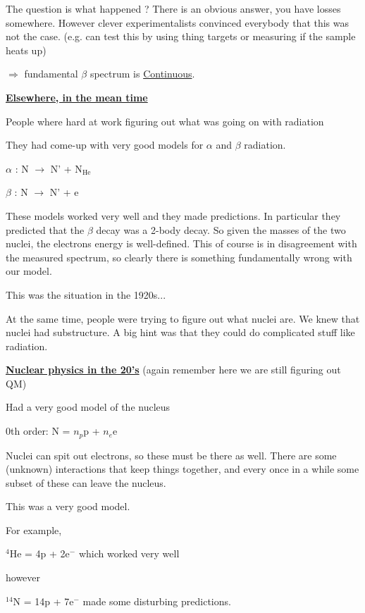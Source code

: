 {The question is what happened ? 
There is an obvious answer, you have losses somewhere. 
However clever experimentalists convinced everybody that this was not the case. 
(e.g. can test this by using thing targets or measuring if the sample heats up)  

$\Rightarrow$ fundamental $\beta$ spectrum is \underline{Continuous}.

\textbf{\underline{Elsewhere, in the mean time} }

People where hard at work figuring out what was going on with radiation

They had come-up with very good models for $\alpha$ and $\beta$ radiation. 

\begin{center}
$\alpha$ : N $\rightarrow$ N' + N$_{\textrm{He}}$

$\beta$ : N $\rightarrow$ N' + e
\end{center}

These models worked very well and they made predictions. 
In particular they predicted that the $\beta$ decay was a 2-body decay. 
So given the masses of the two nuclei, the electrons energy is well-defined. 
This of course is in disagreement with the measured spectrum, so clearly there is something fundamentally wrong with our model. 

This was the situation in the 1920s...

At the same time, people were trying to figure out what nuclei are. 
We knew that nuclei had substructure. 
A big hint was that they could do complicated stuff like radiation.   

\textbf{\underline{Nuclear physics in the 20's}} (again remember here we are still figuring out QM)

Had a very good model of the nucleus

0th order:  N = $n_p$p + $n_e$e

Nuclei can spit out electrons, so these must be there as well.  
There are some (unknown) interactions that keep things together, and every once in a while some subset of these can leave the nucleus. 

This was a very good model. 

For example, 

\begin{center}
$^{4}$He = 4p + 2e$^-$ which worked very well
\end{center}

however 

\begin{center}
$^{14}$N = 14p + 7e$^-$ made some disturbing predictions.   
\end{center}

}
